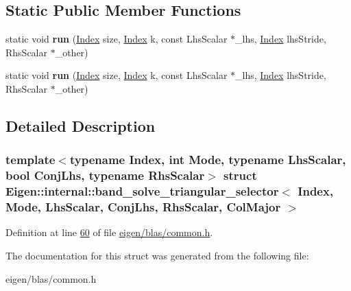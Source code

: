 \subsection*{Static Public Member Functions}
\begin{DoxyCompactItemize}
\item 
\mbox{\label{struct_eigen_1_1internal_1_1band__solve__triangular__selector_3_01_index_00_01_mode_00_01_lhs_sc55928e6c4094ec753b4bf039aa77c921_a0880d4393d6f38ab1456182c9d2c30d8}} 
static void {\bfseries run} (\hyperlink{namespace_eigen_a62e77e0933482dafde8fe197d9a2cfde}{Index} size, \hyperlink{namespace_eigen_a62e77e0933482dafde8fe197d9a2cfde}{Index} k, const Lhs\+Scalar $\ast$\+\_\+lhs, \hyperlink{namespace_eigen_a62e77e0933482dafde8fe197d9a2cfde}{Index} lhs\+Stride, Rhs\+Scalar $\ast$\+\_\+other)
\item 
\mbox{\label{struct_eigen_1_1internal_1_1band__solve__triangular__selector_3_01_index_00_01_mode_00_01_lhs_sc55928e6c4094ec753b4bf039aa77c921_a0880d4393d6f38ab1456182c9d2c30d8}} 
static void {\bfseries run} (\hyperlink{namespace_eigen_a62e77e0933482dafde8fe197d9a2cfde}{Index} size, \hyperlink{namespace_eigen_a62e77e0933482dafde8fe197d9a2cfde}{Index} k, const Lhs\+Scalar $\ast$\+\_\+lhs, \hyperlink{namespace_eigen_a62e77e0933482dafde8fe197d9a2cfde}{Index} lhs\+Stride, Rhs\+Scalar $\ast$\+\_\+other)
\end{DoxyCompactItemize}


\subsection{Detailed Description}
\subsubsection*{template$<$typename Index, int Mode, typename Lhs\+Scalar, bool Conj\+Lhs, typename Rhs\+Scalar$>$\newline
struct Eigen\+::internal\+::band\+\_\+solve\+\_\+triangular\+\_\+selector$<$ Index, Mode, Lhs\+Scalar, Conj\+Lhs, Rhs\+Scalar, Col\+Major $>$}



Definition at line \hyperlink{eigen_2blas_2common_8h_source_l00060}{60} of file \hyperlink{eigen_2blas_2common_8h_source}{eigen/blas/common.\+h}.



The documentation for this struct was generated from the following file\+:\begin{DoxyCompactItemize}
\item 
eigen/blas/common.\+h\end{DoxyCompactItemize}
